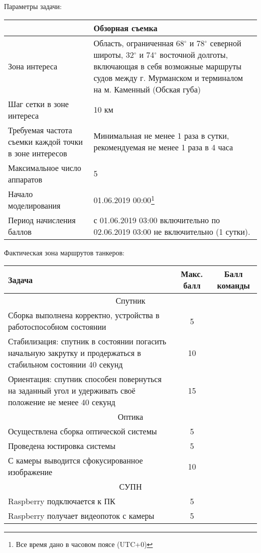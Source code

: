Параметры задачи:

\begin{table}[H]
    \center
    \begin{tabular}{|p{5cm}|p{10cm}|}
        \hline
        &Обзорная съемка \\
        \hline
        Зона интереса & Область, ограниченная 68$^\circ$ и 78$^\circ$ северной широты, 32$^\circ$ и 74$^\circ$  восточной долготы, включающая в себя возможные маршруты судов между г. Мурманском и терминалом на м. Каменный (Обская губа) \\
        \hline
        Шаг сетки в зоне интереса & 10 км \\
        \hline
        Требуемая частота съемки каждой точки в зоне интересов & Минимальная не менее 1 раза в сутки, рекомендуемая не менее 1 раза в 4 часа \\
        \hline
        Максимальное число аппаратов & 5 \\
        \hline
        Начало моделирования & 01.06.2019 00:00\footnote{Все время дано в часовом поясе (UTC+0)}     \\
        \hline
        Период начисления баллов & с 01.06.2019 03:00 включительно по 02.06.2019 03:00 не включительно (1 сутки). \\
        \hline
    \end{tabular}
\end{table}

Фактическая зона маршрутов танкеров:


\markSection

\begin{table}[H]
    \center
    \begin{tabular}{|p{10cm}|c|c|}
        \hline
        Задача	&Макс. балл	&Балл команды \\
        \hline
        \multicolumn{3}{|c|}{Спутник} \\
        \hline
        Сборка выполнена корректно, устройства в работоспособном состоянии	&5	& \\
        \hline
        Стабилизация: спутник в состоянии погасить начальную закрутку и продержаться в стабильном состоянии 40 секунд	&10&\\
        \hline
        Ориентация: спутник способен повернуться на заданный угол и удерживать своё положение не менее 40 секунд&	15&\\
        \hline
        \multicolumn{3}{|c|}{Оптика} \\
        \hline
        Осуществлена сборка оптической системы&	5&\\
        \hline
        Проведена юстировка системы	&5&	\\
        \hline
        С камеры выводится сфокусированное изображение&	10&\\
        \hline
        \multicolumn{3}{|c|}{СУПН} \\
        \hline
        Raspberry подключается к ПК	&5	&\\
        \hline
        Raspberry получает видеопоток с камеры	&5	&\\
        \hline
    \end{tabular}
\end{table}

